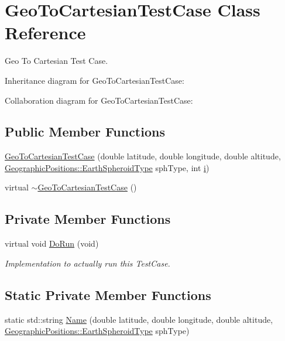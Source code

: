 \hypertarget{classGeoToCartesianTestCase}{}\section{Geo\+To\+Cartesian\+Test\+Case Class Reference}
\label{classGeoToCartesianTestCase}


Geo To Cartesian Test Case.  




Inheritance diagram for Geo\+To\+Cartesian\+Test\+Case\+:


Collaboration diagram for Geo\+To\+Cartesian\+Test\+Case\+:
\subsection*{Public Member Functions}
\begin{DoxyCompactItemize}
\item 
\hyperlink{classGeoToCartesianTestCase_a8d8bfa5e4dc0fb2b0f2edc42294b6403}{Geo\+To\+Cartesian\+Test\+Case} (double latitude, double longitude, double altitude, \hyperlink{classns3_1_1GeographicPositions_a434138b76563c284972bc08a9c4a6882}{Geographic\+Positions\+::\+Earth\+Spheroid\+Type} sph\+Type, int \hyperlink{lte__uplink__power__control_8m_a6f6ccfcf58b31cb6412107d9d5281426}{i})
\item 
virtual \hyperlink{classGeoToCartesianTestCase_aa35d127d911a4f1a2537a92084bb880f}{$\sim$\+Geo\+To\+Cartesian\+Test\+Case} ()
\end{DoxyCompactItemize}
\subsection*{Private Member Functions}
\begin{DoxyCompactItemize}
\item 
virtual void \hyperlink{classGeoToCartesianTestCase_a4906d673a6ce3dc8f9545d3f410b0aab}{Do\+Run} (void)
\begin{DoxyCompactList}\small\item\em Implementation to actually run this Test\+Case. \end{DoxyCompactList}\end{DoxyCompactItemize}
\subsection*{Static Private Member Functions}
\begin{DoxyCompactItemize}
\item 
static std\+::string \hyperlink{classGeoToCartesianTestCase_adb170552fc50fa98d13b6f989ba3b74a}{Name} (double latitude, double longitude, double altitude, \hyperlink{classns3_1_1GeographicPositions_a434138b76563c284972bc08a9c4a6882}{Geographic\+Positions\+::\+Earth\+Spheroid\+Type} sph\+Type)
\end{DoxyCompactItemize}

